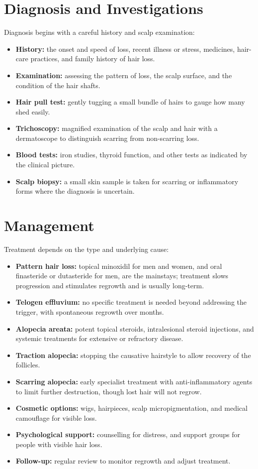 \section*{Diagnosis and Investigations}
Diagnosis begins with a careful history and scalp examination:

\begin{itemize}
    \item \textbf{History:} the onset and speed of loss, recent illness or stress, medicines, hair-care practices, and family history of hair loss.
    \item \textbf{Examination:} assessing the pattern of loss, the scalp surface, and the condition of the hair shafts.
    \item \textbf{Hair pull test:} gently tugging a small bundle of hairs to gauge how many shed easily.
    \item \textbf{Trichoscopy:} magnified examination of the scalp and hair with a dermatoscope to distinguish scarring from non-scarring loss.
    \item \textbf{Blood tests:} iron studies, thyroid function, and other tests as indicated by the clinical picture.
    \item \textbf{Scalp biopsy:} a small skin sample is taken for scarring or inflammatory forms where the diagnosis is uncertain.
\end{itemize}

\section*{Management}
Treatment depends on the type and underlying cause:

\begin{itemize}
    \item \textbf{Pattern hair loss:} topical minoxidil for men and women, and oral finasteride or dutasteride for men, are the mainstays; treatment slows progression and stimulates regrowth and is usually long-term.
    \item \textbf{Telogen effluvium:} no specific treatment is needed beyond addressing the trigger, with spontaneous regrowth over months.
    \item \textbf{Alopecia areata:} potent topical steroids, intralesional steroid injections, and systemic treatments for extensive or refractory disease.
    \item \textbf{Traction alopecia:} stopping the causative hairstyle to allow recovery of the follicles.
    \item \textbf{Scarring alopecia:} early specialist treatment with anti-inflammatory agents to limit further destruction, though lost hair will not regrow.
    \item \textbf{Cosmetic options:} wigs, hairpieces, scalp micropigmentation, and medical camouflage for visible loss.
    \item \textbf{Psychological support:} counselling for distress, and support groups for people with visible hair loss.
    \item \textbf{Follow-up:} regular review to monitor regrowth and adjust treatment.
\end{itemize}

